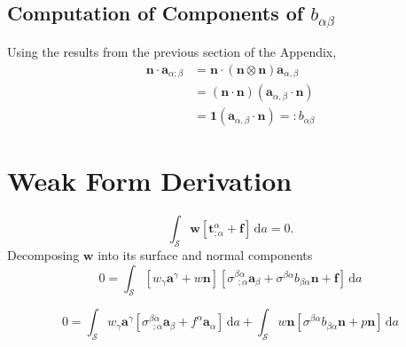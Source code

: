     \subsection{Computation of Components of \texorpdfstring{$b_{\alpha \beta}$}{Curvature tensor}}
    Using the results from the previous section of the Appendix,
    \begin{equation}\label{appendices:curvature_tensor_derivation}
        \begin{split}
            \boldsymbol{n} \cdot \boldsymbol{a}_{\alpha ; \beta} &= \boldsymbol{n} \cdot \left( \boldsymbol{n} \otimes \boldsymbol{n} \right) \boldsymbol{a}_{\alpha, \beta} \\
            &= \left( \boldsymbol{n} \cdot \boldsymbol{n} \right) \left( \boldsymbol{a}_{\alpha, \beta} \cdot \boldsymbol{n} \right) \\
            &= \boldsymbol{1} \left( \boldsymbol{a}_{\alpha, \beta} \cdot \boldsymbol{n} \right) =: b_{\alpha \beta}
        \end{split}
    \end{equation}
\section{Weak Form Derivation} \label{appendices:weak_form_derivation}

    \begin{equation}\label{eq:weak_1}
        \int_{\mathcal{S}} \boldsymbol{w} \left[ \boldsymbol{t}_{; \alpha}^{\alpha} + \boldsymbol{f} \right] \, \mathrm{d} a = 0.
    \end{equation}
    Decomposing $\boldsymbol{w}$ into its surface and normal components     
    \begin{equation}\label{eq:weak_2}
        0 = \int_{\mathcal{S}} \left[ w_{\gamma} \boldsymbol{a}^{\gamma} + w \boldsymbol{n} \right] \left[ \sigma_{~~; \alpha}^{\beta \alpha} \boldsymbol{a}_{\beta} + \sigma^{\beta \alpha} b_{\beta \alpha} \boldsymbol{n} + \boldsymbol{f} \right] \, \mathrm{d} a
    \end{equation}
        
        \begin{equation}\label{eq:weak_3}
        0 = \int_{\mathcal{S}} w_{\gamma} \boldsymbol{a}^{\gamma} \left[ \sigma^{\beta \alpha}_{~~; \alpha} \boldsymbol{a}_{\beta} + f^{\alpha} \boldsymbol{a}_{\alpha} \right] \, \mathrm{d} a + \int_{\mathcal{S}} w \boldsymbol{n} \left[ \sigma^{\beta \alpha} b_{\beta \alpha} \boldsymbol{n} + p \boldsymbol{n} \right] \, \mathrm{d} a
        \end{equation}
        
